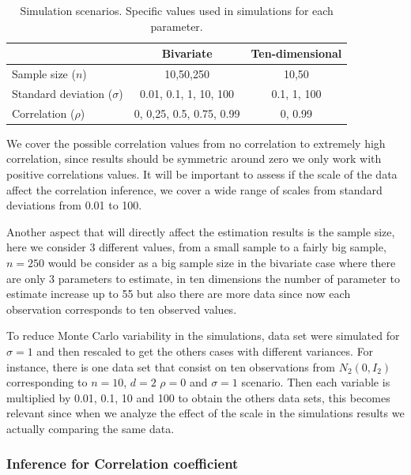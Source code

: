 \documentclass[a4paper]{article}
\begin{document}
\begin{table}[htbp]
   \centering
   \caption{Simulation scenarios. Specific values used in simulations for each parameter. \label{scen}} 
     \begin{tabular}{lcc} \hline
          &  Bivariate    & Ten-dimensional  \\ \hline
      Sample size   ($n$)   & 10,50,250   &  10,50  \\
      Standard deviation ($\sigma$)  & 0.01, 0.1, 1, 10, 100 & 0.1, 1, 100 \\
      Correlation ($\rho$)   &  0, 0,25, 0.5, 0.75, 0.99  &  0, 0.99 \\ \hline
   \end{tabular}
\end{table}

We cover the possible correlation values from no correlation to extremely high correlation, since results should be symmetric around zero we only work with positive correlations values. It will be important to assess if the scale of the data affect the correlation inference, we cover a wide range of scales from standard deviations from 0.01 to 100. 

Another aspect that will directly affect the estimation results is the sample size, here we consider 3 different values, from a small sample to a fairly big sample, $n=250$ would be consider as a big sample size in the bivariate case where there are only 3 parameters to estimate, in ten dimensions the number of parameter to estimate increase up to 55 but also there are more data since now each observation corresponds to ten observed values. 

To reduce Monte Carlo variability in the simulations, data set were simulated for $\sigma=1$ and then rescaled to get the others cases with different variances. For instance, there is one data set that consist on ten observations from $N_2(0, I_2 )$ corresponding to $n=10$, $d=2$ $\rho=0$ and $\sigma=1$ scenario. Then each variable is multiplied by 0.01, 0.1, 10  and 100 to obtain the others data sets, this becomes relevant since when we analyze the effect of the scale in the simulations results we actually comparing the same data. 

\subsubsection{Inference for Correlation coefficient}
\end{document}
